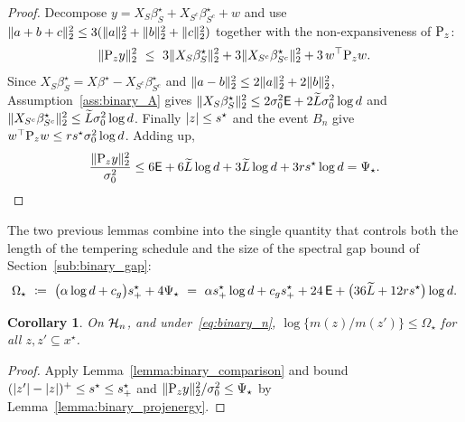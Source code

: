 \documentclass[aos]{imsart}%
\DeclarePairedDelimiter{\norm}{\lVert}{\rVert}
\DeclarePairedDelimiter{\abs}{\lvert}{\rvert}
\theoremstyle{plain}
\newtheorem{corollary}{Corollary}[section]
\theoremstyle{definition}
\begin{document}
    \begin{proof}
        Decompose $y=X_S\beta^\star_S+X_{S^{c}}\beta^\star_{S^{c}}+w$ and use
        $\norm{a+b+c}_2^{2}\leq3(\norm a_2^{2}+\norm b_2^{2}+\norm c_2^{2})$
        together with the non-expansiveness of $\mathrm{P}_z$:
        \begin{equation*}
            \norm{\Proj_zy}_2^{2}\ \leq\ 3\norm{X_S\beta^\star_S}_2^{2}
            +3\norm{X_{S^{c}}\beta^\star_{S^{c}}}_2^{2}
            +3\,w^{\top}\Proj_zw .
        \end{equation*}
        Since $X_S\beta^\star_S=X\beta^\star-X_{S^{c}}\beta^\star_{S^{c}}$ and
        $\norm{a-b}_2^{2}\leq2\norm a_2^{2}+2\norm b_2^{2}$,
        Assumption~\ref{ass:binary_A} gives
        $\norm{X_S\beta^\star_S}_2^{2}\leq2\sigma_0^{2}\Energy
        +2\Ltil\sigma_0^{2}\log d$ and
        $\norm{X_{S^{c}}\beta^\star_{S^{c}}}_2^{2}\leq\Ltil\sigma_0^{2}\log d$.
        Finally $\abs z\leq s^{\star}$ and the event $B_n$ give
        $w^{\top}\mathrm{P}_zw\leq rs^{\star}\sigma_0^{2}\log d$. Adding up,
        \begin{equation*}
            \frac{\norm{\Proj_zy}_2^{2}}{\sigma_0^{2}}
            \leq6\Energy+6\Ltil\log d+3\Ltil\log d+3rs^{\star}\log d
            =\Psi_\star . \qedhere
        \end{equation*}
    \end{proof}

    The two previous lemmas combine into the single quantity that controls both
    the length of the tempering schedule and the size of the spectral gap
    bound of Section~\ref{sub:binary_gap}:
    \begin{equation}
        \label{eq:binary_Omega}
        \Omega_\star\ \coloneq\ \bigl(\alpha\log d+c_g\bigr)s^\star_+
        +4\Psi_\star
        \ =\ \alpha s^\star_+\log d+c_gs^\star_++24\,\mathsf{E}
        +\bigl(36\widetilde{L}+12rs^{\star}\bigr)\log d .
    \end{equation}

    \begin{corollary}
        \label{cor:binary_subsets}
        On $\mathcal{H}_n$, and under~\eqref{eq:binary_n},
        $\log\{m(z)/m(z')\}\leq\Omega_\star$ for all
        $z,z'\subseteq x^{\star}$.
    \end{corollary}

    \begin{proof}
        Apply Lemma~\ref{lemma:binary_comparison} and bound
        $(\abs{z'}-\abs z)^{+}\leq s^{\star}\leq s^\star_+$ and
        $\norm{\Proj_zy}_2^{2}/\sigma_0^{2}\leq\Psi_\star$ by
        Lemma~\ref{lemma:binary_projenergy}.
    \end{proof}
\end{document}
